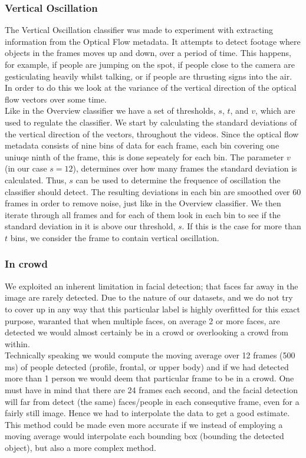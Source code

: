 \subsubsection{Vertical Oscillation}
%
%
The Vertical Oscillation classifier was made to experiment with extracting information from the Optical Flow metadata. It attempts to detect footage where objects in the frames moves up and down, over a period of time. This happens, for example, if people are jumping on the spot, if people close to the camera are gesticulating heavily whilst talking, or if people are thrusting signs into the air. In order to do this we look at the variance of the vertical direction of the optical flow vectors over some time.\\
Like in the Overview classifier we have a set of thresholds, $s$, $t$, and $v$, which are used to regulate the classifier. We start by calculating the standard deviations of the vertical direction of the vectors, throughout the videos. Since the optical flow metadata consists of nine bins of data for each frame, each bin covering one uniuqe ninth of the frame, this is done sepeately for each bin. The parameter $v$ (in our case $s = 12$), determines over how many frames the standard deviation is calculated. Thus, $s$ can be used to determine the frequence of oscillation the classifier should detect. The resulting deviations in each bin are smoothed over 60 frames in order to remove noise, just like in the Overview classifier. We then iterate through all frames and for each of them look in each bin to see if the standard deviation in it is above our threshold, $s$. If this is the case for more than $t$ bins, we consider the frame to contain vertical oscillation.
%
%
\subsubsection{In crowd}
%
We exploited an inherent limitation in facial detection; that faces far away in the image are rarely detected. Due to the nature of our datasets, and we do not try to cover up in any way that this particular label is highly overfitted for this exact purpose, waranted that when multiple faces, on average 2 or more faces, are detected we would almost certainly be in a crowd or overlooking a crowd from within.\\
Technically speaking we would compute the moving average over 12 frames (500 ms) of people detected (profile, frontal, or upper body) and if we had detected more than 1 person we would deem that particular frame to be in a crowd. One must have in mind that there are 24 frames each second, and the facial detection will far from detect (the same) faces/people in each consequtive frame, even for a fairly still image. Hence we had to interpolate the data to get a good estimate.\\
This method could be made even more accurate if we instead of employing a moving average would interpolate each bounding box (bounding the detected object), but also a more complex method.
%

